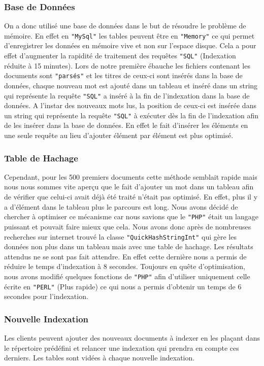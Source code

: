 \documentclass[11pt,a4paper]{article}
\begin{document}
\subsubsection{Base de Données}
On a donc utilisé une base de données dans le but de résoudre le problème de mémoire. En effet en \verb|"MySql"| les tables peuvent être en \verb|"Memory"| ce qui permet d'enregistrer les données en mémoire vive et non sur l'espace disque. Cela a pour effet d'augmenter la rapidité de traitement des requêtes \verb|"SQL"| (Indexation réduite à 15 minutes).
\medbreak
Lors de notre première ébauche les fichiers contenant les documents sont \verb|"parsés"| et les titres de ceux-ci sont insérés dans la base de données, chaque nouveau mot est ajouté dans un tableau et inséré dans un string qui représente la requête \verb|"SQL"| a inséré à la fin de l'indexation dans la base de données.
\medbreak
A l'instar des nouveaux mots lus, la position de ceux-ci est insérée dans un string qui représente la requête \verb|"SQL"| à exécuter dès la fin de l'indexation afin de les insérer dans la base de données. En effet le fait d'insérer les éléments en une seule requête au lieu d'ajouter élément par élément est plus optimisé.
\subsubsection{Table de Hachage}
Cependant, pour les 500 premiers documents cette méthode semblait rapide mais nous nous sommes vite aperçu que le fait d'ajouter un mot dans un tableau afin de vérifier que celui-ci avait déjà été traité n'était pas optimisé.
\medbreak
En effet, plus il y a d'élément dans le tableau plus le parcours est long. Nous avons décidé de chercher à optimiser ce mécanisme car nous savions que le \verb|"PHP"| était un langage puissant et pouvait faire mieux que cela.
\medbreak
Nous avons donc après de nombreuses recherches sur internet trouvé la classe \verb|"QuickHashStringInt"| qui gère les données non plus dans un tableau mais avec une table de hachage. Les résultats attendus ne se sont pas fait attendre. En effet cette dernière nous a permis de réduire le temps d’indexation à 8 secondes.
\medbreak
Toujours en quête d'optimisation, nous avons modifié quelques fonctions de \verb|"PHP"| afin d'utiliser uniquement celle écrite en \verb|"PERL"| (Plus rapide) ce qui nous a permis d’obtenir un temps de 6 secondes pour l'indexation.
\subsubsection{Nouvelle Indexation}
Les clients peuvent ajouter des nouveaux documents à indexer en les plaçant dans le répertoire prédéfini et relancer une indexation qui prendra en compte ces derniers.
\medbreak
Les tables sont vidées à chaque nouvelle indexation.
\end{document}
